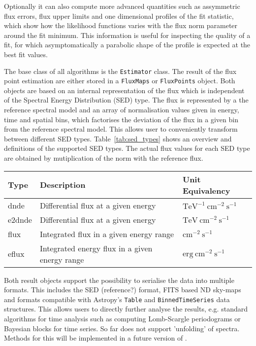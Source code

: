 \documentclass[traditabstract, longauth]{aa}
\newcommand{\code}[1]{\texttt{#1}}
\begin{document}
Optionally it can also compute more advanced quantities
such as assymmetric flux errors, flux upper limits
and one dimensional profiles of the fit statistic,
which show how the likelihood functions varies with
the flux norm parameter around the fit minimum.
This information is useful for inspecting the quality
of a fit, for which asymptomatically a parabolic
shape of the profile is expected at the best fit
values.

The base class of all algorithms is the \code{Estimator}  class.
The result of the flux point estimation are either stored in a
\code{FluxMaps} or \code{FluxPoints} object. Both objects
are based on an internal representation of the flux which is
independent of the Spectral Energy Distribution (SED) type. The flux is represented by a
the reference spectral model and an array of
normalisation values given in energy, time and spatial bins,
which factorises the deviation of the flux in a given
bin from the reference spectral model. This allows
user to conveniently transform between different
SED types. Table~\ref{tab:sed_types} shows an
overview and definitions of the supported SED types.
The actual flux values for each SED type are obtained
by mutiplication of the norm with the  reference flux.

\begin{table*}
    \begin{center}
        \begin{tabular}{lll}
         \hline
         Type & Description & Unit Equivalency \\
         \hline
         dnde & Differential flux at a given energy & $\mathrm{TeV^{-1}~cm^{-2}~s^{-1}}$ \\
         e2dnde & Differential flux at a given energy  & $\mathrm{TeV~cm^{-2}~s^{-1}}$ \\
         flux & Integrated flux in a given energy range & $\mathrm{cm^{-2}~s^{-1}}$ \\
         eflux & Integrated energy flux in a given energy range & $\mathrm{erg~cm^{-2}~s^{-1}}$\\
         \hline
        \end{tabular}
    \end{center}
    \label{tab:sed_types}
    \caption{Definition of the different SED types supported in \gammapy.}
\end{table*}


Both result objects support the possibility to serialise
the data into multiple formats. This includes the
\gadf SED (reference?) format, FITS based ND sky-maps
and formats compatible with Astropy's \code{Table} and
\code{BinnedTimeSeries} data structures. This allows
users to directly further analyse the results, e.g.
standard algorithms for time analysis such as
computing Lomb-Scargle periodograms or Bayesian
blocks for time series. So far \gammapy does not
support 'unfolding' of \gammaray spectra.
Methods for this will be implemented in a future version of \gammapy.
\end{document}
